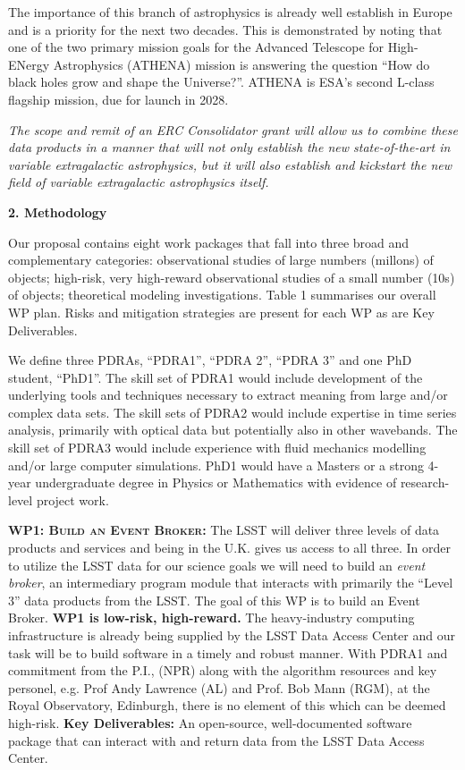 \documentclass[oneside, a4paper, onecolumn, 11pt]{article}
\begin{document}
\smallskip
\smallskip
\noindent
The importance of this branch of astrophysics is already well
establish in Europe and is a priority for the next two decades. This
is demonstrated by noting that one of the two primary mission goals
for the Advanced Telescope for High-ENergy Astrophysics (ATHENA) mission 
is answering the question ``How do black holes grow and shape the
Universe?''.  ATHENA is ESA's second L-class flagship mission, due for
launch in 2028.

\smallskip
\smallskip
\noindent
{\it The scope and remit of an ERC Consolidator grant will allow us to
combine these data products in a manner that will not only establish
the new state-of-the-art in variable extragalactic astrophysics, but it 
will also establish and kickstart the new field of variable extragalactic
astrophysics itself.}




\medskip
\medskip
\noindent
\large
{\bf{\textcolor{Cerulean}{2. Methodology}}}
\normalsize

\noindent
Our proposal contains eight work packages that fall into three broad
and complementary categories: observational studies of large numbers
(millons) of objects; high-risk, very high-reward observational
studies of a small number (10s) of objects; theoretical modeling
investigations. Table 1 summarises our overall WP plan. Risks and
mitigation strategies are present for each WP as are Key Deliverables.

\smallskip
\smallskip
\noindent
We define three PDRAs, ``PDRA1'', ``PDRA 2'', ``PDRA 3'' and one PhD
student, ``PhD1''.  The skill set of PDRA1 would include development
of the underlying tools and techniques necessary to extract meaning
from large and/or complex data sets.  The skill sets of PDRA2 would
include expertise in time series analysis, primarily with optical
data but potentially also in other wavebands.  The skill set of PDRA3
would include experience with fluid mechanics modelling and/or large
computer simulations.  PhD1 would have a Masters or a strong 4-year
undergraduate degree in Physics or Mathematics with evidence of
research-level project work.


\smallskip
\smallskip
\noindent
\textbf{\textsc{WP1: Build an Event Broker:}} 
The LSST will deliver three levels of data products and services and
being in the U.K. gives us access to all three.  In order to utilize
the LSST data for our science goals we will need to build an {\it
event broker}, an intermediary program module that interacts with
primarily the ``Level 3'' data products from the LSST.
The goal of this WP is to build an Event Broker.  {\bf WP1 is
low-risk, high-reward.}  The heavy-industry computing infrastructure
is already being supplied by the LSST Data Access Center and our task
will be to build software in a timely and robust manner. With PDRA1
and commitment from the P.I., (NPR) along with the algorithm resources
and key personel, e.g. Prof Andy Lawrence (AL) and Prof. Bob Mann
(RGM), at the Royal Observatory, Edinburgh, there is no element of
this which can be deemed high-risk.  {\bf Key Deliverables:} An
open-source, well-documented software package that can interact with
and return data from the LSST Data Access Center.
\end{document}

